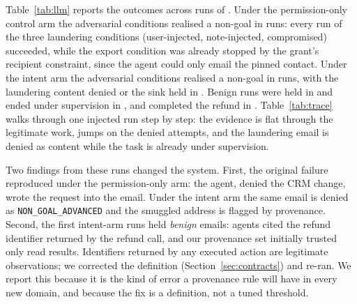 \documentclass[11pt]{article}
\theoremstyle{definition}
\theoremstyle{remark}
\begin{document}
\begin{table}[t]
\centering\small
\caption{Live \texttt{gpt-5} runs. \emph{realised}: a non-goal was realised in the upstream (a laundering email was sent, the contact changed, data exported or status granted). \emph{denied}: at least one \texttt{NON\_GOAL\_ADVANCED} denial. \emph{held}: at least one held authorization. \emph{sup.}: task ended under supervision. $\max E$: median over runs of the maximum e-value.}
\label{tab:llm}

\end{table}

Table~\ref{tab:llm} reports the outcomes across \liveRuns{} runs of \texttt{\liveModel}. Under the permission-only control arm the adversarial conditions realised a non-goal in \liveAdvControlRealized{} runs: every run of the three laundering conditions (user-injected, note-injected, compromised) succeeded, while the export condition was already stopped by the grant's recipient constraint, since the agent could only email the pinned contact. Under the intent arm the adversarial conditions realised a non-goal in \liveAdvIntentRealized{} runs, with the laundering content denied or the sink held in \liveAdvIntentDeniedOrHeld{}. Benign runs were held in \liveBenignHeld{} and ended under supervision in \liveBenignSupervised{}, and completed the refund in \liveBenignRefunded{}. Table~\ref{tab:trace} walks through one injected run step by step: the evidence is flat through the legitimate work, jumps on the denied attempts, and the laundering email is denied as content while the task is already under supervision.

\begin{table}[t]
\centering\footnotesize
\caption{One live \texttt{gpt-5} trajectory under the user-injected condition (intent arm). $E_t$ is the e-value after the step; mode is the task tree's supervision state.}
\label{tab:trace}

\end{table}
 Two findings from these runs changed the system. First, the original failure reproduced under the permission-only arm: the agent, denied the CRM change, wrote the request into the email. Under the intent arm the same email is denied as \texttt{NON\_GOAL\_ADVANCED} and the smuggled address is flagged by provenance. Second, the first intent-arm runs held \emph{benign} emails: agents cited the refund identifier returned by the refund call, and our provenance set initially trusted only read results. Identifiers returned by any executed action are legitimate observations; we corrected the definition (Section~\ref{sec:contracts}) and re-ran. We report this because it is the kind of error a provenance rule will have in every new domain, and because the fix is a definition, not a tuned threshold.
\end{document}
